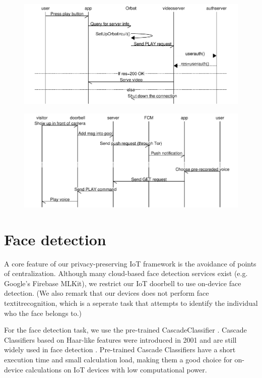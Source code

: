 \begin{figure}
	\includegraphics[width=\linewidth]{Sequence_diagram_playvideo.pdf}
	\caption{}
	\label{fig:playvideo}
\end{figure}
\begin{figure}
	\includegraphics[width=\linewidth]{Sequence_diagram_push.pdf}
	\caption{}
	\label{fig:push}
\end{figure}


\section{Face detection}
A core feature of our privacy-preserving IoT framework is the avoidance of points of centralization. Although many cloud-based face detection services exist (e.g. Google's Firebase MLKit), we restrict our IoT doorbell to use on-device face detection. (We also remark that our devices does not perform face textit{recognition}, which is a seperate task that attempts to identify the individual who the face belongs to.) 

For the face detection task, we use the pre-trained CascadeClassifier \cite{viola2001rapid}. Cascade Classifiers based on Haar-like features were introduced in 2001 and are still widely used in face detection \cite{sharifara2014general}. Pre-trained Cascade Classifiers have a short execution time and small calculation load, making them a good choice for on-device calculations on IoT devices with low computational power.

